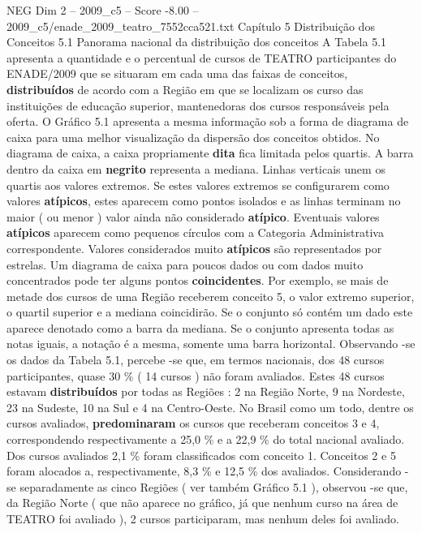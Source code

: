 \begin{textsample}{NEG Dim 2 – 2009\_c5 – Score -8.00 – 2009\_c5/enade\_2009\_teatro\_7552cca521.txt}  \label{ex:f2_neg_018}
Capítulo 5 Distribuição dos Conceitos 5.1 Panorama nacional da distribuição dos conceitos A Tabela 5.1 apresenta a quantidade e o percentual de cursos de TEATRO participantes do ENADE/2009 que se situaram em cada uma das faixas de conceitos, \textbf{distribuídos} de acordo com a Região em que se localizam os curso das instituições de educação superior, mantenedoras dos cursos responsáveis pela oferta.
O Gráfico 5.1 apresenta a mesma informação sob a forma de diagrama de caixa para uma melhor visualização da dispersão dos conceitos obtidos.
No diagrama de caixa, a caixa propriamente \textbf{dita} fica limitada pelos quartis.
A barra dentro da caixa em \textbf{negrito} representa a mediana.
Linhas verticais unem os quartis aos valores extremos.
Se estes valores extremos se configurarem como valores \textbf{atípicos}, estes aparecem como pontos isolados e as linhas terminam no maior ( ou menor ) valor ainda não considerado \textbf{atípico}.
Eventuais valores \textbf{atípicos} aparecem como pequenos círculos com a Categoria Administrativa correspondente.
Valores considerados muito \textbf{atípicos} são representados por estrelas.
Um diagrama de caixa para poucos dados ou com dados muito concentrados pode ter alguns pontos \textbf{coincidentes}.
Por exemplo, se mais de metade dos cursos de uma Região receberem conceito 5, o valor extremo superior, o quartil superior e a mediana coincidirão.
Se o conjunto só contém um dado este aparece denotado como a barra da mediana.
Se o conjunto apresenta todas as notas iguais, a notação é a mesma, somente uma barra horizontal.
Observando -se os dados da Tabela 5.1, percebe -se que, em termos nacionais, dos 48 cursos participantes, quase 30 \% ( 14 cursos ) não foram avaliados.
Estes 48 cursos estavam \textbf{distribuídos} por todas as Regiões : 2 na Região Norte, 9 na Nordeste, 23 na Sudeste, 10 na Sul e 4 na Centro-Oeste.
No Brasil como um todo, dentre os cursos avaliados, \textbf{predominaram} os cursos que receberam conceitos 3 e 4, correspondendo respectivamente a 25,0 \% e a 22,9 \% do total nacional avaliado.
Dos cursos avaliados 2,1 \% foram classificados com conceito 1.
Conceitos 2 e 5 foram alocados a, respectivamente, 8,3 \% e 12,5 \% dos avaliados.
Considerando -se separadamente as cinco Regiões ( ver também Gráfico 5.1 ), observou -se que, da Região Norte ( que não aparece no gráfico, já que nenhum curso na área de TEATRO foi avaliado ), 2 cursos participaram, mas nenhum deles foi avaliado.

\end{textsample}
